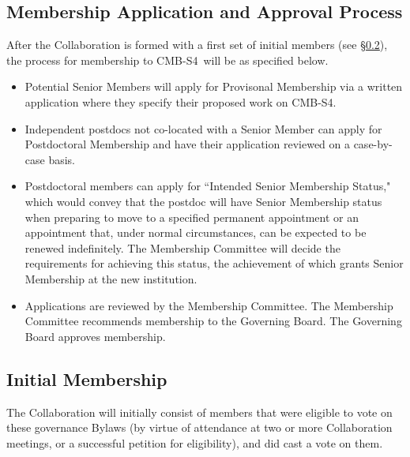 \documentclass[12pt]{article}
\newcommand\collabname{CMB-S4}
\begin{document}
\subsection{Membership Application and Approval Process}
After the Collaboration is formed with a first set of initial members (see \S\ref{sec:initmembership}), the process for membership to \collabname\ will be as specified below.

\begin{itemize}

\item Potential Senior Members will apply for Provisonal Membership via a written application where they specify their proposed work on \collabname.

\item Independent postdocs not co-located with a Senior Member can apply for Postdoctoral Membership and have their application reviewed on a case-by-case basis. 

\item Postdoctoral members can apply for ``Intended Senior Membership Status," which would convey that the postdoc will have Senior Membership status when preparing to move to a specified permanent appointment or an appointment that, under normal circumstances, can be expected to be renewed indefinitely.  The Membership Committee will decide the requirements for achieving this status, the achievement of which grants Senior Membership at the new institution.

\item Applications are reviewed by the Membership Committee. The Membership Committee recommends membership to the Governing Board.  The Governing Board approves membership.

\end{itemize}

\subsection{Initial Membership}
\label{sec:initmembership}
The Collaboration will initially consist of members that were eligible to vote on these governance Bylaws (by virtue of attendance at two or more Collaboration meetings, or a successful petition for eligibility), and did cast a vote on them. 

%
%
\end{document}
